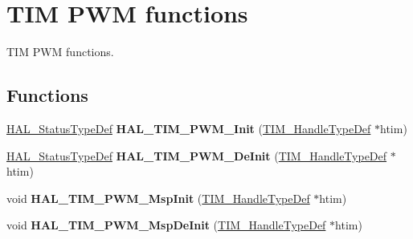 \hypertarget{group___t_i_m___exported___functions___group3}{}\section{T\+IM P\+WM functions}
\label{group___t_i_m___exported___functions___group3}


T\+IM P\+WM functions.  


\subsection*{Functions}
\begin{DoxyCompactItemize}
\item 
\mbox{\label{group___t_i_m___exported___functions___group3_ga25824b2eed564cc37a8983b99a83bdc7}} 
\mbox{\hyperlink{stm32f7xx__hal__def_8h_a63c0679d1cb8b8c684fbb0632743478f}{H\+A\+L\+\_\+\+Status\+Type\+Def}} {\bfseries H\+A\+L\+\_\+\+T\+I\+M\+\_\+\+P\+W\+M\+\_\+\+Init} (\mbox{\hyperlink{struct_t_i_m___handle_type_def}{T\+I\+M\+\_\+\+Handle\+Type\+Def}} $\ast$htim)
\item 
\mbox{\label{group___t_i_m___exported___functions___group3_ga5bb7b197ace5bab9ef120163ff1520bd}} 
\mbox{\hyperlink{stm32f7xx__hal__def_8h_a63c0679d1cb8b8c684fbb0632743478f}{H\+A\+L\+\_\+\+Status\+Type\+Def}} {\bfseries H\+A\+L\+\_\+\+T\+I\+M\+\_\+\+P\+W\+M\+\_\+\+De\+Init} (\mbox{\hyperlink{struct_t_i_m___handle_type_def}{T\+I\+M\+\_\+\+Handle\+Type\+Def}} $\ast$htim)
\item 
\mbox{\label{group___t_i_m___exported___functions___group3_gaf94d3d2003a4eebed73744ccd5c85974}} 
void {\bfseries H\+A\+L\+\_\+\+T\+I\+M\+\_\+\+P\+W\+M\+\_\+\+Msp\+Init} (\mbox{\hyperlink{struct_t_i_m___handle_type_def}{T\+I\+M\+\_\+\+Handle\+Type\+Def}} $\ast$htim)
\item 
\mbox{\label{group___t_i_m___exported___functions___group3_ga3abff1ab9a918c30db77c7890e6e2b07}} 
void {\bfseries H\+A\+L\+\_\+\+T\+I\+M\+\_\+\+P\+W\+M\+\_\+\+Msp\+De\+Init} (\mbox{\hyperlink{struct_t_i_m___handle_type_def}{T\+I\+M\+\_\+\+Handle\+Type\+Def}} $\ast$htim)
\item 
\mbox{\label{group___t_i_m___exported___functions___group3_ga11da9bda53a5d21c293bb01da91e592d}} 

\end{DoxyCompactItemize}
